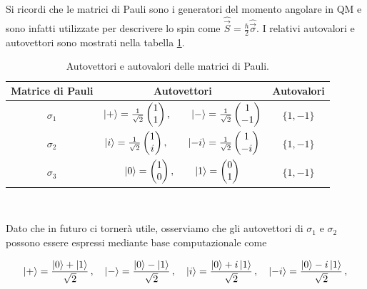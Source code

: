 \noindent Si ricordi che le matrici di Pauli sono i generatori del momento angolare in QM e sono infatti utilizzate per descrivere lo spin come $\hat{\vec{S}} = \frac{\hbar}{2} \hat{\vec{\sigma}}$. I relativi autovalori e autovettori sono mostrati nella tabella \ref{tab:Pauli_eig}.

\begin{table}[!ht]
	\centering
    \begin{tabular}{ccc}
        \toprule
        \textbf{Matrice di Pauli} & \textbf{Autovettori} & \textbf{Autovalori}  \\
        \midrule
        $\sigma_1$ & $\ket + = \frac{1}{\sqrt 2} \begin{pmatrix} 1 \\ 1 \end{pmatrix}, \qquad \ket - = \frac{1}{\sqrt 2} \begin{pmatrix} 1 \\ -1 \end{pmatrix} $ & $\lbrace 1, -1 \rbrace$ \\
        $\sigma_2$ & $\ket i = \frac{1}{\sqrt 2} \begin{pmatrix} 1 \\ i \end{pmatrix}, \qquad \ket{-i} = \frac{1}{\sqrt 2} \begin{pmatrix} 1 \\ -i \end{pmatrix} $ & $\lbrace 1, -1 \rbrace$ \\
        $\sigma_3$ & $\ket 0 = \begin{pmatrix} 1 \\ 0 \end{pmatrix}, \qquad \ket 1 = \begin{pmatrix} 0 \\ 1 \end{pmatrix} $ & $\lbrace 1,-1 \rbrace$ \\
        \bottomrule
    \end{tabular}\\
    \caption{Autovettori e autovalori delle matrici di Pauli.}
    \label{tab:Pauli_eig}
\end{table}

\noindent Dato che in futuro ci tornerà utile, osserviamo che gli autovettori di $\sigma_1$ e $\sigma_2$ possono essere espressi mediante base computazionale come

\begin{equation}\label{basi_di_sigma_12}
    \ket + = \frac{\ket 0 + \ket 1}{\sqrt 2} \, , \quad \ket - = \frac{\ket 0 - \ket 1}{\sqrt 2} \, , \quad \ket i = \frac{\ket 0 + i \ket 1}{\sqrt 2} \, , \quad \ket{-i} = \frac{\ket 0 - i \ket 1}{\sqrt 2} \, ,
\end{equation}


